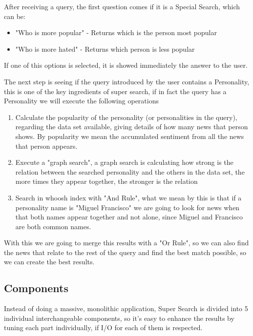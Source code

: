\documentclass{acm_proc_article-sp}
\begin{document}
After receiving a query, the first question comes if it is a Special Search, which can be:

\begin{itemize}
  \item "Who is more popular" - Returns which is the person most popular
  \item "Who is more hated" - Returns which person is less popular 
\end{itemize}

If one of this options is selected, it is showed immediately the answer to the user.

The next step is seeing if the query introduced by the user contains a Personality, this is one of the key ingredients of super search, if in fact the query has a Personality we will execute the following operations

\begin{enumerate}
  \item Calculate the popularity of the personality (or personalities in the query), regarding the data set available, giving details of how many news that person shows. By popularity we mean the accumulated sentiment from all the news that person appears. 
  \item Execute a "graph search", a graph search is calculating how strong is the relation between the searched personality and the others in the data set, the more times they appear together, the stronger is the relation
  \item Search in whoosh index with "And Rule", what we mean by this is that if a personality name is "Miguel Francisco" we are going to look for news when that both names appear together and not alone, since Miguel and Francisco are both common names.
\end{enumerate} 

With this we are going to merge this results with a "Or Rule", so we can also find the news that relate to the rest of the query and find the best match possible, so we can create the best results.

\subsection{Components}

Instead of doing a massive, monolithic application, Super Search is divided into 5 individual interchangeable components, so it's easy to enhance the results by tuning each part individually, if I/O for each of them is respected.
\end{document}
